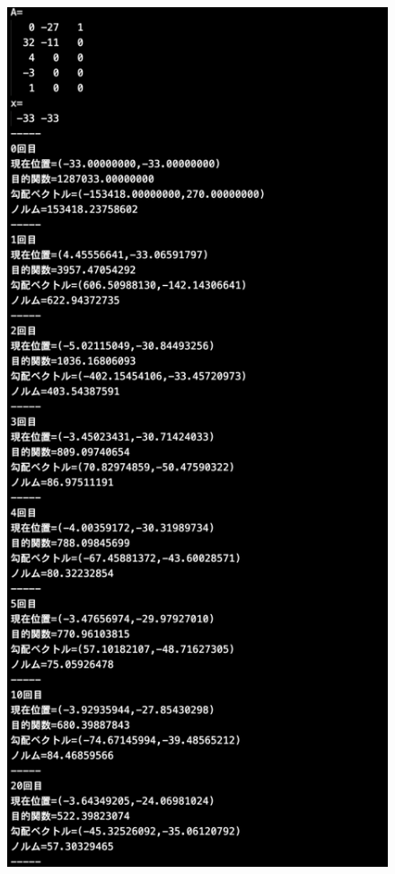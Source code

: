 \documentclass[12pt]{jarticle}
\begin{document}
\clearpage
\begin{figure}[h]
    \begin{center}
        \includegraphics[scale=0.2]{kadai1_2s_out1_2_1.png}
    \end{center}

\end{figure}
\end{document}
